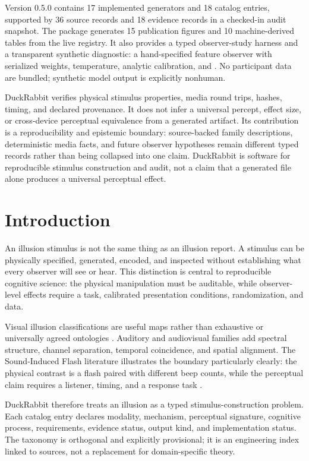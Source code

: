 \documentclass[
  english,
]{article}
\begin{document}
Version 0.5.0 contains 17 implemented generators and 18 catalog entries,
supported by 36 source records and 18 evidence records in a checked-in
audit snapshot. The package generates 15 publication figures and 10
machine-derived tables from the live registry. It also provides a typed
observer-study harness and a transparent synthetic diagnostic: a
hand-specified feature observer with serialized weights, temperature,
analytic calibration, and . No participant
data are bundled; synthetic model output is explicitly nonhuman.

DuckRabbit verifies physical stimulus properties, media round trips,
hashes, timing, and declared provenance. It does not infer a universal
percept, effect size, or cross-device perceptual equivalence from a
generated artifact. Its contribution is a reproducibility and epistemic
boundary: source-backed family descriptions, deterministic media facts,
and future observer hypotheses remain different typed records rather
than being collapsed into one claim. DuckRabbit is software for
reproducible stimulus construction and audit, not a claim that a
generated file alone produces a universal perceptual effect.

\newpage

\section{Introduction}\label{sec:introduction}

An illusion stimulus is not the same thing as an illusion report. A
stimulus can be physically specified, generated, encoded, and inspected
without establishing what every observer will see or hear. This
distinction is central to reproducible cognitive science: the physical
manipulation must be auditable, while observer-level effects require a
task, calibrated presentation conditions, randomization, and data.

Visual illusion classifications are useful maps rather than exhaustive
or universally agreed ontologies \citep{gregory1997visual}. Auditory and
audiovisual families add spectral structure, channel separation,
temporal coincidence, and spatial alignment. The Sound-Induced Flash
literature illustrates the boundary particularly clearly: the physical
contrast is a flash paired with different beep counts, while the
perceptual claim requires a listener, timing, and a response task
\citep{hirst2020sound, shams2000sifi}.

DuckRabbit therefore treats an illusion as a typed stimulus-construction
problem. Each catalog entry declares modality, mechanism, perceptual
signature, cognitive process, requirements, evidence status, output
kind, and implementation status. The taxonomy is orthogonal and
explicitly provisional; it is an engineering index linked to sources,
not a replacement for domain-specific theory.
\end{document}
